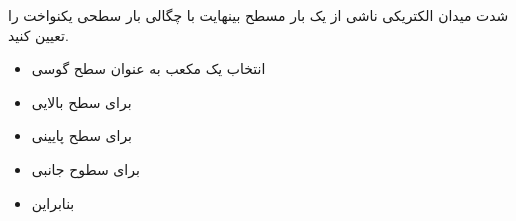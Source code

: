 \begin{ELexample}{}

شدت میدان الکتریکی ناشی از یک بار مسطح بینهایت با چگالی بار سطحی یکنواخت  را تعیین کنید.


\begin{ELsolution}


\begin{itemize}
\tightlist
\item
  انتخاب یک مکعب به عنوان سطح گوسی
\item
  برای سطح بالایی
\end{itemize}


\begin{itemize}
\tightlist
\item
  برای سطح پایینی
\end{itemize}


\begin{itemize}
\tightlist
\item
  برای سطوح جانبی
\end{itemize}


\begin{itemize}
\tightlist
\item
  بنابراین
\end{itemize}


\begin{ELimportant}{}


\end{ELimportant}

\end{ELsolution}

\end{ELexample}

